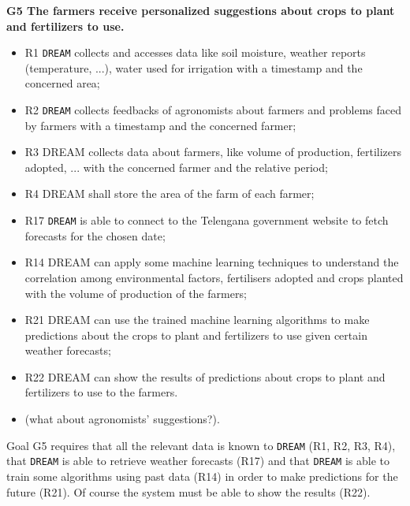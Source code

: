\documentclass{article}
\begin{document}
\vspace{5mm}
\textbf{G5 The farmers receive personalized suggestions about crops to plant and fertilizers to use.}
\begin{itemize}
    \item R1 \verb|DREAM| collects and accesses data like soil moisture, weather reports (temperature, ...), water used for irrigation with a timestamp and the concerned area;

    \item R2 \verb|DREAM| collects feedbacks of agronomists about farmers and problems faced by farmers with a timestamp and the concerned farmer;

    \item R3 DREAM collects data about farmers, like volume of production, fertilizers adopted, ... with the concerned farmer and the relative period;

    \item R4 DREAM shall store the area of the farm of each farmer;

    \item R17 \verb|DREAM| is able to connect to the Telengana government website to fetch forecasts for the chosen date;

    \item R14 DREAM can apply some machine learning techniques to understand the correlation among environmental factors, fertilisers adopted and crops planted with the volume of production of the farmers;

    \item R21 DREAM can use the trained machine learning algorithms to make predictions about the crops to plant and fertilizers to use given certain weather forecasts;

    \item R22 DREAM can show the results of predictions about crops to plant and fertilizers to use to the farmers.

    \item \color{red}(what about agronomists' suggestions?).
\end{itemize}
Goal G5 requires that all the relevant data is known to \verb|DREAM| (R1, R2, R3, R4), that \verb|DREAM| is able to retrieve weather forecasts (R17) and that \verb|DREAM| is able to train some algorithms using past data (R14) in order to make predictions for the future (R21). Of course the system must be able to show the results (R22).
\end{document}
